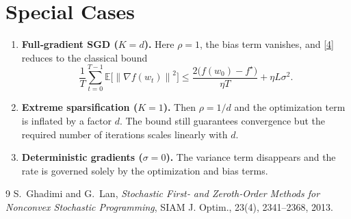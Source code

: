 \documentclass{article}
\newcommand{\E}{\mathbb{E}}
\newcommand{\norm}[1]{\left\|#1\right\|}
\begin{document}
\section*{Special Cases}
\begin{enumerate}[label=\arabic*.]
\item \textbf{Full‑gradient SGD ($K=d$).} Here $\rho=1$, the bias term vanishes, and \eqref{4} reduces to the classical bound
\[
\frac{1}{T}\sum_{t=0}^{T-1}\E\!\bigl[\norm{\nabla f(w_t)}^{2}\bigr]
\le
\frac{2\bigl(f(w_0)-f^\star\bigr)}{\eta T}
+\eta L\sigma^{2}.
\]
\item \textbf{Extreme sparsification ($K=1$).} Then $\rho=1/d$ and the optimization term is inflated by a factor $d$.  The bound still guarantees convergence but the required number of iterations scales linearly with $d$.
\item \textbf{Deterministic gradients ($\sigma=0$).} The variance term disappears and the rate is governed solely by the optimization and bias terms.
\end{enumerate}

\begin{thebibliography}{9}
S.~Ghadimi and G.~Lan,
\emph{Stochastic First‑ and Zeroth‑Order Methods for Nonconvex Stochastic Programming},
SIAM J. Optim., 23(4), 2341–2368, 2013.
\end{thebibliography}
\end{document}
